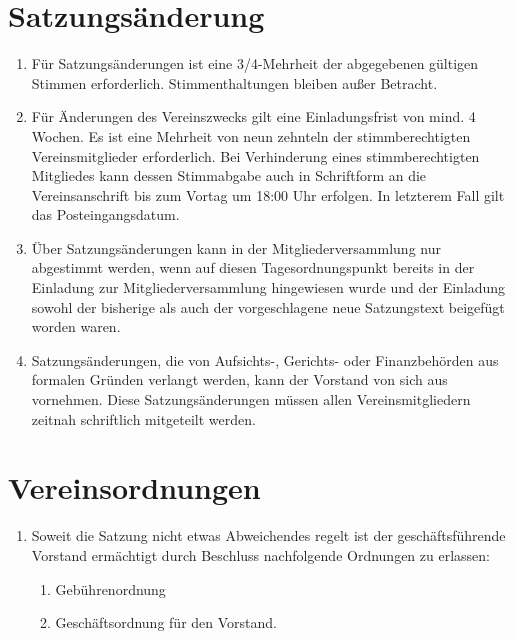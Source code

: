 \documentclass[a4paper,ngerman]{scrartcl}
\newcommand{\customref}[1]{\sectionref{#1}, Absatz \ref{#1}}
\begin{document}
\section{Satzungsänderung}
\begin{enumerate}
\item Für Satzungsänderungen ist eine 3/4-Mehrheit der abgegebenen gültigen Stimmen erforderlich. Stimmenthaltungen bleiben außer Betracht.
\item Für Änderungen des Vereinszwecks gilt eine Einladungsfrist von mind. 4 Wochen. Es ist eine Mehrheit von neun zehnteln der stimmberechtigten Vereinsmitglieder erforderlich. Bei Verhinderung eines stimmberechtigten Mitgliedes kann dessen Stimmabgabe auch in Schriftform an die Vereinsanschrift bis zum Vortag um 18:00 Uhr erfolgen. In letzterem Fall gilt das Posteingangsdatum.
\item Über Satzungsänderungen kann in der Mitgliederversammlung nur abgestimmt werden, wenn auf diesen Tagesordnungspunkt bereits in der Einladung zur Mitgliederversammlung hingewiesen wurde und der Einladung sowohl der bisherige als auch der vorgeschlagene neue Satzungstext beigefügt worden waren.
\item Satzungsänderungen, die von Aufsichts-, Gerichts- oder Finanzbehörden aus formalen Gründen verlangt werden, kann der Vorstand von sich aus vornehmen. Diese Satzungsänderungen müssen allen Vereinsmitgliedern zeitnah schriftlich mitgeteilt werden.
\end{enumerate}

\section{Vereinsordnungen}
\begin{enumerate}
\item Soweit die Satzung nicht etwas Abweichendes regelt ist der geschäftsführende Vorstand ermächtigt durch Beschluss nachfolgende Ordnungen zu erlassen:
\begin{enumerate}
\item Gebührenordnung
\item Geschäftsordnung für den Vorstand.
\end{enumerate}
\end{enumerate}
\end{document}
